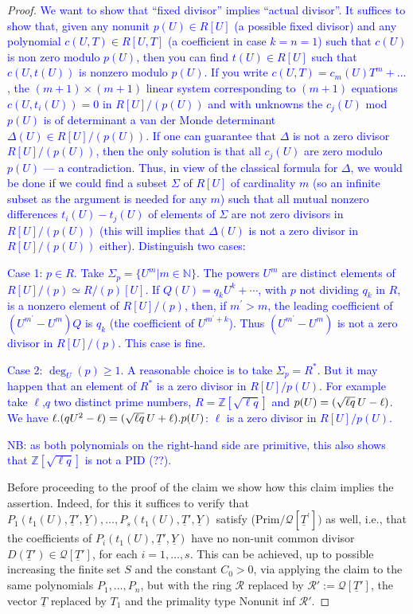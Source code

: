 \documentclass[11pt,a4paper,reqno]{amsart}
\theoremstyle{definition}
\begin{document}
\begin{proof}
\textcolor{blue}{We want to show that ``fixed divisor'' implies ``actual divisor''. It suffices to show that, given any nonunit $p(U)\in R[U]$ (a possible fixed divisor) and any polynomial $c(U,T) \in R[U,T]$ (a coefficient in case $k=n=1$) such that $c(U)$ is non zero modulo $p(U)$, then you can find $t(U)\in R[U]$ such that $c(U,t(U))$ is nonzero modulo $p(U)$. If you write $c(U,T) = c_m(U) T^m + ...$, the $(m+1)\times(m+1)$ linear system corresponding to $(m+1)$ equations 
 $c(U,t_i(U)) = 0$ in $R[U]/(p(U))$ and with unknowns the $c_j(U)$ mod $p(U)$ is of determinant a van der Monde determinant $\Delta(U) \in R[U]/(p(U))$. If one can guarantee that $\Delta$ is not a zero divisor $R[U]/(p(U))$, then the only solution is that all $c_j(U)$ are zero modulo $p(U)$ --- a contradiction.
 Thus, in view of the classical formula for $\Delta$, we would be done if we could find a subset $\Sigma$ of $R[U]$ of cardinality $m$ (so an infinite subset as the argument is needed for any $m$) such that all mutual nonzero differences $t_i(U) - t_j(U)$ of elements of $\Sigma$ are not zero divisors in $R[U]/(p(U))$ (this will implies that $\Delta(U)$ is not a zero divisor in $R[U]/(p(U))$ either). Distinguish two cases:}
 \vskip 1mm 
 
\textcolor{blue}{ Case 1: $p\in R$. Take $\Sigma_p = \{U^m | m\in {\mathbb N} \}$. The powers $U^m$ are  distinct elements of $R[U]/(p) \simeq R/(p)[U]$. If $Q(U) = q_kU^k+ \cdots$, with $p$ not dividing $q_k$ in $R$, is a nonzero element of $R[U]/(p)$, then, if $m^\prime > m$, the leading coefficient of $(U^{m^{\prime}} - U^m) Q$ is $q_k$ (the coefficient of $U^{m^\prime + k}$). Thus $(U^{m^{\prime}} - U^m)$   is not a zero divisor in $R[U]/(p)$.
 This case is fine.}
\vskip 1mm

\textcolor{blue}{Case 2: $\deg_U(p) \geq 1$. A reasonable choice is to take $\Sigma_p = R^\ast$. But it may happen that an element of $R^\ast$ is a zero divisor in $R[U]/p(U)$. For example take $\ell$,$q$ two distinct prime numbers,  $R= {\mathbb Z}[\sqrt{\ell q}]$ and $p(U) = (\sqrt{\ell q} \hskip 2pt U-\ell)$. We have $\ell.(qU^2-\ell) = (\sqrt{\ell q}\hskip 2pt U+\ell).p(U)$: $\ell$ is a zero divisor in $R[U]/p(U)$.}

\noindent
\textcolor{blue}{NB: as both polynomials on the right-hand side are primitive, this also shows that ${\mathbb Z}[\sqrt{\ell q}]$ is not a PID (??).}
\fi

Before proceeding to the proof of the claim we show how this claim implies the assertion. Indeed, for this it suffices to verify that $P_1(t_1(U),\underline T', \underline Y), \dots, P_s(t_1(U),\underline T',\underline Y)$
satisfy {\rm (Prim}$/{\mathcal Q}[\underline T^\prime])$ as well, i.e., that the coefficients of $P_i(t_1(U),\underline T', \underline Y)$ have no non-unit common divisor $D(\underline{T}')\in \mathcal{Q}[\underline{T}']$, for each $i=1,\dots, s$. This can be achieved, up to possible increasing the finite set $S$ and the constant $C_0>0$, via applying the claim to the same polynomials $P_1,\dots, P_n$, but with the ring $\mathcal{R}$ replaced by $\mathcal R' := \mathcal Q[\underline T']$, the vector $\underline{T}$ replaced by $T_1$ and the primality type Nonunit inf $\mathcal{R}'$.


\end{proof}
\end{document}
